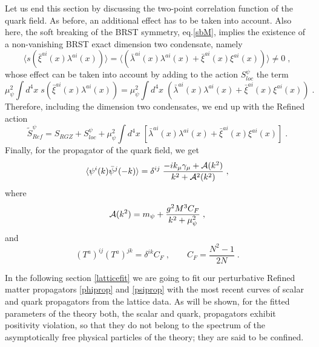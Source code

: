 Let us end this section by discussing the two-point correlation function of the quark field. As before, an additional effect has to be taken into account. Also here,  the soft breaking of the BRST symmetry, eq.\eqref{sbM}, implies the existence of a non-vanishing BRST exact dimension two condensate, namely 
%
\begin{equation}
\langle s ( {\bar {\xi}}^{ai}(x)  {\lambda}^{ai}(x) ) \rangle = \langle ( {\bar \lambda}^{ai}(x)  {\lambda}^{ai}(x)  + {\bar  \xi}^{ai}(x)  {\xi}^{ai}(x) ) \rangle \neq 0 \;,  \label{condpsi}
\end{equation}
%
whose effect can be taken into account by adding to the action $S^{\psi}_{loc}$ the term 
%
\begin{equation}
\mu^2_\psi \int d^4x \; s   ( {\bar {\xi}}^{ai}(x)  {\lambda}^{ai}(x) )   = \mu^2_\psi \int d^4x\;  ( {\bar \lambda}^{ai}(x)  {\lambda}^{ai}(x)  + {\bar  \xi}^{ai}(x)  {\xi}^{ai}(x) )  \;.  \label{accondpsi}
\end{equation}
%
Therefore, including the dimension two condensates, we end up with the Refined action 
%
\begin{equation}
	{\tilde S}_{Ref}^{\psi} =  S_{RGZ} + S^{\psi}_{loc} +  \mu^2_\psi \int d^4x\;  \left[ {\bar \lambda}^{ai}(x)  {\lambda}^{ai}(x)  + {\bar  \xi}^{ai}(x)  {\xi}^{ai}(x) \right]   \;. \label{refpsi}
\end{equation}
%
Finally, for the propagator of the quark field, we get 
%
\begin{equation} 
\langle  \psi^{i}(k)  {\bar \psi}^{j}(-k) \rangle   =   \delta^{ij} \;  \frac{-ik_\mu
\gamma_\mu + {\cal A}(k^2)}{k^2 + {\cal A}^2(k^2)}  \;, \label{psiprop}
\end{equation} 
%
 where 
%
\begin{equation}
{\cal A}(k^2) = m_{\psi} + \frac{g^2 M^3 C_F}{k^2+\mu^2_\psi} \;, \label{A}
\end{equation}
%
and 
%
\begin{equation}
 (T^a)^{ij} (T^a)^{jk} = \delta^{ik} C_F \;, \qquad C_F= \frac{N^2-1}{2N}  \;.    \label{norm}
\end{equation}
%


In the following section \ref{latticefit} we are going to fit our perturbative Refined matter
propagators \eqref{phiprop} and \eqref{psiprop} with the most recent curves of scalar and quark
propagators from the lattice data. As will be shown, for the fitted parameters of the theory
both, the scalar and quark, propagators exhibit positivity violation, so that they do not
belong to the spectrum of the asymptotically free physical particles of the theory; they are
said to be confined.

















